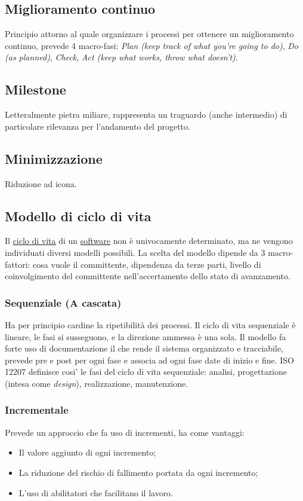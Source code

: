 	
	\subsection{Miglioramento continuo}
	\label{sec:miglioramentocontinuo}
	Principio attorno al quale organizzare i processi per ottenere un miglioramento continuo, prevede 4 macro-fasi:
	\emph{Plan (keep track of what you're going to do)}, \emph{Do (as planned)}, \emph{Check}, \emph{Act (keep what works, throw what doesn't)}.

	
	\subsection{Milestone}
	\label{sec:milestone}	
	Letteralmente pietra miliare, rappresenta un traguardo (anche intermedio) di particolare rilevanza per l'andamento del progetto.
	
	
	\subsection{Minimizzazione}
	\label{sec:minimizzazione}
	Riduzione ad icona.

	
	\subsection{Modello di ciclo di vita}
	\label{sec:modelliciclodivita}
	Il \underline{\hyperref[sec:ciclodivita]{ciclo di vita}} di un \underline{\hyperref[sec:prodottosoftware]{software}} non è univocamente determinato, ma ne vengono individuati diversi modelli possibili. La scelta del modello dipende da 3 macro-fattori: cosa vuole il committente, dipendenza da terze parti, livello di coinvolgimento del committente nell'accertamento dello stato di avanzamento.

		
		\subsubsection{Sequenziale (A cascata)}
			Ha per principio cardine la ripetibilità dei processi.
			Il ciclo di vita sequenziale è lineare, le fasi si susseguono, e la direzione
			ammessa è una sola.
			Il modello fa forte uso di documentazione il che rende il sistema organizzato e tracciabile, prevede pre e post per ogni fase e associa ad ogni fase date di inizio e fine.
ISO 12207 definisce cosi' le fasi del ciclo di vita sequenziale: analisi, progettazione (intesa come \textit{design}), realizzazione, manutenzione.

		
		\subsubsection{Incrementale}
			Prevede un approccio che fa uso di incrementi, ha come vantaggi:
			\begin{itemize}
			\item Il valore aggiunto di ogni incremento;
			\item La riduzione del rischio di fallimento portata da ogni incremento;
			\item L'uso di abilitatori che facilitano il lavoro.
			\end{itemize}

